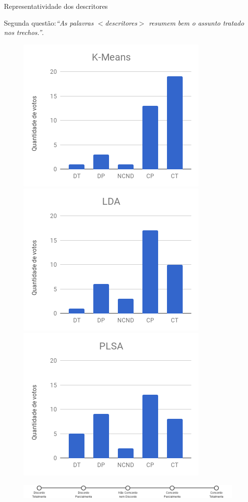 \documentclass[xcolor=table]{beamer}
\begin{document}
\begin{frame}{Representatividade dos descritores}

	\center\small 
	Segunda questão:\textit{``As palavras \textit{$<$descritores$>$} resumem bem o assunto tratado nos trechos.''}.

\begin{figure}[!h] \centering     %

	\includegraphics[width=.31\textwidth]{images/figuras-experimento/Q2-KMeans.png}
	\includegraphics[width=.31\textwidth]{images/figuras-experimento/Q2-LDA.png}
	\includegraphics[width=.31\textwidth]{images/figuras-experimento/Q2-PLSA.png}
\end{figure}

\begin{figure}[!h] \centering     %
	\includegraphics[width=.9\textwidth]{images/likert.png}
\end{figure}

\end{frame}
\end{document}
